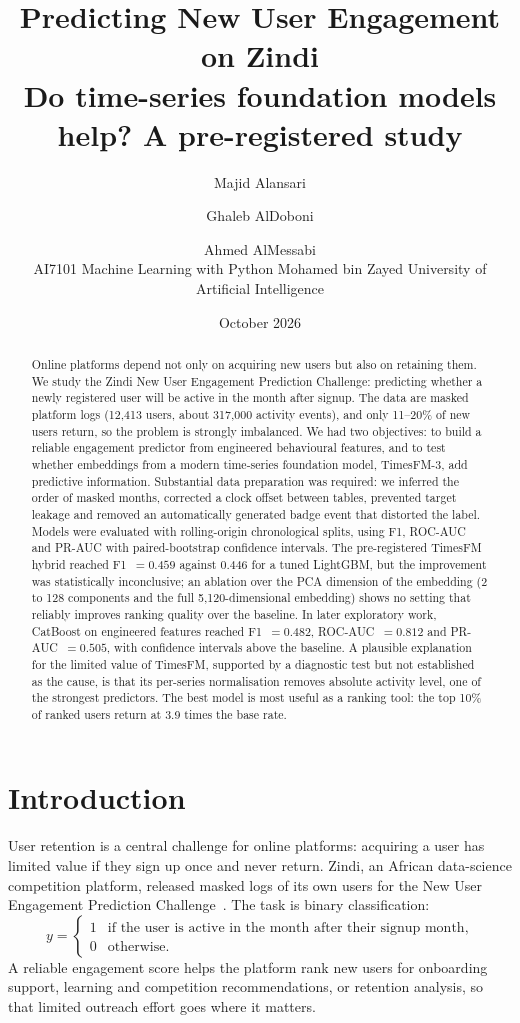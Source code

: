 \documentclass[11pt,a4paper]{article}
\title{\textbf{Predicting New User Engagement on Zindi}\\[4pt]
\large Do time-series foundation models help? A pre-registered study}
\author{Majid Alansari \and Ghaleb AlDoboni \and Ahmed AlMessabi\\[4pt]
\small AI7101 Machine Learning with Python \quad\textperiodcentered\quad Mohamed bin Zayed University of Artificial Intelligence}
\date{October 2026}
\begin{document}
\maketitle

\begin{abstract}
Online platforms depend not only on acquiring new users but also on retaining them. We study the Zindi
New User Engagement Prediction Challenge: predicting whether a newly registered user will be active in the
month after signup. The data are masked platform logs (12{,}413 users, about 317{,}000 activity events),
and only 11--20\% of new users return, so the problem is strongly imbalanced. We had two objectives: to
build a reliable engagement predictor from engineered behavioural features, and to test whether embeddings
from a modern time-series foundation model, TimesFM-3, add predictive information. Substantial data
preparation was required: we inferred the order of masked months, corrected a clock offset between tables,
prevented target leakage and removed an automatically generated badge event that distorted the label. Models
were evaluated with rolling-origin chronological splits, using F1, ROC-AUC and PR-AUC with paired-bootstrap
confidence intervals. The pre-registered TimesFM hybrid reached F1~$=0.459$ against $0.446$ for a tuned
LightGBM, but the improvement was statistically inconclusive; an ablation over the PCA dimension of the
embedding (2 to 128 components and the full 5{,}120-dimensional embedding) shows no setting that reliably improves ranking quality over
the baseline. In later exploratory work, CatBoost on engineered features reached F1~$=0.482$,
ROC-AUC~$=0.812$ and PR-AUC~$=0.505$, with confidence intervals above the baseline. A plausible explanation for
the limited value of TimesFM, supported by a diagnostic test but not established as the cause, is that its
per-series normalisation removes absolute activity level, one of the strongest predictors. The
best model is most useful as a ranking tool: the top 10\% of ranked users return at 3.9 times the base rate.
\end{abstract}

\section{Introduction}
User retention is a central challenge for online platforms: acquiring a user has limited value if they sign
up once and never return. Zindi, an African data-science competition platform, released masked logs of its
own users for the New User Engagement Prediction Challenge~\citep{zindi2022}. The task is binary
classification:
\[
y = \begin{cases} 1 & \text{if the user is active in the month after their signup month,}\\ 0 & \text{otherwise.}\end{cases}
\]
A reliable engagement score helps the platform rank new users for onboarding support, learning and
competition recommendations, or retention analysis, so that limited outreach effort goes where it matters.
\end{document}
